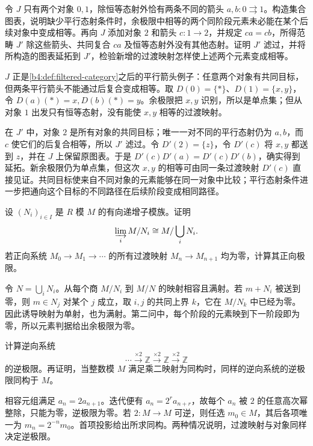 \begin{exercise}\label{b4:ex:02-parallel-filtered-condition}
	令 \(J\) 只有两个对象 \(0,1\)，除恒等态射外恰有两条不同的箭头 \(a,b:0\rightrightarrows1\)。构造集合图表，说明缺少平行态射条件时，余极限中相等的两个同阶段元素未必能在某个后续对象中变成相等。再向 \(J\) 添加对象 \(2\) 和箭头 \(c:1\rightarrow2\)，并规定 \(ca=cb\)，所得范畴 \(J'\) 除这些箭头、共同复合 \(ca\) 及恒等态射外没有其他态射。证明 \(J'\) 滤过，并将所构造的图表延拓到 \(J'\)，检验新增的过渡映射怎样使上述两个元素变成相等。
\end{exercise}
\begin{solution}
	\(J\) 正是\cref{b4:def:filtered-category}之后的平行箭头例子：任意两个对象有共同目标，但两条平行箭头不能通过后复合变成相等。取 \(D(0)=\{*\}\)、\(D(1)=\{x,y\}\)，令 \(D(a)(*)=x,D(b)(*)=y\)。余极限把 \(x,y\) 识别，所以是单点集；但从对象 \(1\) 出发只有恒等态射，没有能使 \(x,y\) 相等的过渡映射。

	在 \(J'\) 中，对象 \(2\) 是所有对象的共同目标；唯一一对不同的平行态射仍为 \(a,b\)，而 \(c\) 使它们的后复合相等，所以 \(J'\) 滤过。令 \(D'(2)=\{z\}\)，令 \(D'(c)\) 将 \(x,y\) 都送到 \(z\)，并在 \(J\) 上保留原图表。于是 \(D'(c)D'(a)=D'(c)D'(b)\)，确实得到延拓。新余极限仍为单点集，但这次 \(x,y\) 的相等可由同一条过渡映射 \(D'(c)\) 直接见证。共同目标使来自不同对象的元素能够在同一对象中比较；平行态射条件进一步把通向这个目标的不同路径在后续阶段变成相同路径。
\end{solution}

\begin{exercise}\label{b4:ex:02-directed-quotients}
	设 \((N_i)_{i\in I}\) 是 \(R\) 模 \(M\) 的有向递增子模族。证明
	\[
		\varinjlim_i M/N_i\cong M/\bigcup_iN_i.
	\]
	若正向系统 \(M_0\rightarrow M_1\rightarrow\cdots\) 的所有过渡映射 \(M_n\rightarrow M_{n+1}\) 均为零，计算其正向极限。
\end{exercise}
\begin{solution}
	令 \(N=\bigcup_iN_i\)。从每个商 \(M/N_i\) 到 \(M/N\) 的映射相容且满射。若 \(m+N_i\) 被送到零，则 \(m\in N_j\) 对某个 \(j\) 成立，取 \(i,j\) 的共同上界 \(k\)，它在 \(M/N_k\) 中已经为零。因此诱导映射为单射，也为满射。第二问中，每个阶段的元素映到下一阶段即为零，所以元素判据给出余极限为零。
\end{solution}

\begin{exercise}\label{b4:ex:02-inverse-multiplication}
	计算逆向系统
	\[
		\cdots\xrightarrow{\times2}\mathbb Z \xrightarrow{\times2}\mathbb Z \xrightarrow{\times2}\mathbb Z
	\]
	的逆极限。再证明，当整数模 \(M\) 满足乘二映射为同构时，同样的逆向系统的逆极限同构于 \(M\)。
\end{exercise}
\begin{solution}
	相容元组满足 \(a_n=2a_{n+1}\)。迭代便有 \(a_n=2^ra_{n+r}\)，故每个 \(a_n\) 被 \(2\) 的任意高次幂整除，只能为零，逆极限为零。若 \(2:M\rightarrow M\) 可逆，则任选 \(m_0\in M\)，其后各项唯一为 \(m_n=2^{-n}m_0\)。首项投影给出所求同构。两种情况说明，过渡映射与对象同样决定逆极限。
\end{solution}

